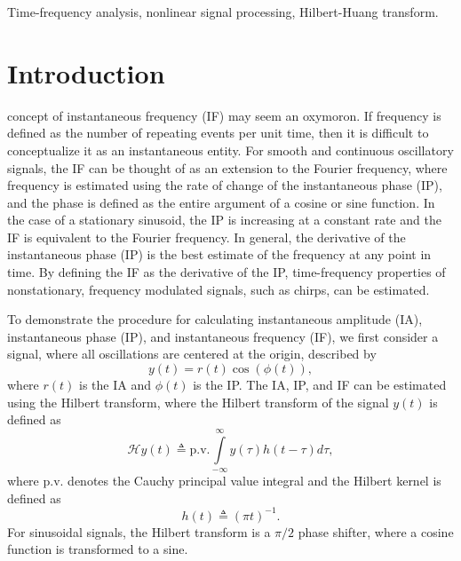 \documentclass[a4paper]{IEEEtran}
\begin{document}
\begin{IEEEkeywords}
Time-frequency analysis, nonlinear signal processing, Hilbert-Huang transform.
\end{IEEEkeywords}

\IEEEpeerreviewmaketitle

\section{Introduction}
 concept of instantaneous frequency (IF) may seem an oxymoron. If frequency is defined as the number of repeating events per unit time, then it is difficult to conceptualize it as an instantaneous entity. For smooth and continuous oscillatory signals, the IF can be thought of as an extension to the Fourier frequency, where frequency is estimated using the rate of change of the instantaneous phase (IP), and the phase is defined as the entire argument of a cosine or sine function. In the case of a stationary sinusoid, the IP is increasing at a constant rate and the IF is equivalent to the Fourier frequency. In general, the derivative of the instantaneous phase (IP) is the best estimate of the frequency at any point in time. By defining the IF as the derivative of the IP, time-frequency properties of nonstationary, frequency modulated signals, such as chirps, can be estimated. 

To demonstrate the procedure for calculating instantaneous amplitude (IA), instantaneous phase (IP), and instantaneous frequency (IF), we first consider a signal, where all oscillations are centered at the origin, described by
\begin{equation}
	y(t) = r(t)\cos(\phi(t)),
\end{equation}
where $r(t)$ is the IA and $\phi(t)$ is the IP. The IA, IP, and IF can be estimated using the Hilbert transform, where the Hilbert transform of the signal $y(t)$ is defined as
\begin{equation}\label{eq:HilbertTransform}
	\mathcal{H}y\left( t \right) \triangleq \textrm{p.v.}\int\limits_{ - \infty }^\infty  {y\left( \tau  \right)h\left( {t - \tau } \right)} d\tau,
\end{equation}
where $\textrm{p.v.}$ denotes the Cauchy principal value integral and the Hilbert kernel is defined as
\begin{equation}\label{eq:HilbertKernel}
	h\left( t \right) \triangleq {\left( {\pi t} \right)^{ - 1}}.
\end{equation}
For sinusoidal signals, the Hilbert transform is a $\pi/2$ phase shifter, where a cosine function is transformed to a sine.
\end{document}
